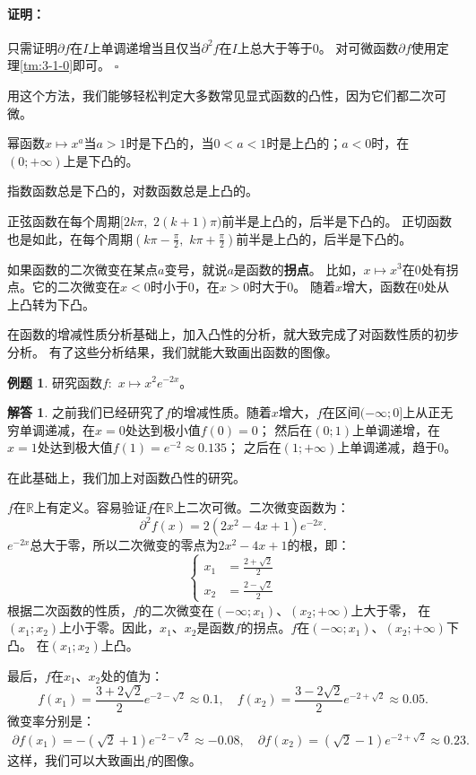 \documentclass[12pt,UTF8]{ctexbook}
\theoremstyle{definition}
\newtheorem{et}{例题}[section]
\newtheorem*{so}{解答}
\theoremstyle{plain}
\renewenvironment{proof}{\paragraph{\textbf{证明：}}}{\hfill$\square$}
\begin{document}
\begin{proof}
    只需证明$\partial f$在$I$上单调递增当且仅当$\partial^2 f$在$I$上总大于等于$0$。
    对可微函数$\partial f$使用定理\ref{tm:3-1-0}即可。
\end{proof}

用这个方法，我们能够轻松判定大多数常见显式函数的凸性，因为它们都二次可微。

幂函数$x\mapsto x^a$当$a>1$时是下凸的，当$0<a<1$时是上凸的；$a<0$时，在$(0;+\infty)$上是下凸的。

指数函数总是下凸的，对数函数总是上凸的。

正弦函数在每个周期$[2k\pi, \,\, 2(k+1)\pi)$前半是上凸的，后半是下凸的。
正切函数也是如此，在每个周期$(k\pi-\frac{\pi}{2}, \,\, k\pi+\frac{\pi}{2})$前半是上凸的，后半是下凸的。

如果函数的二次微变在某点$a$变号，就说$a$是函数的\textbf{拐点}。
比如，$x\mapsto x^3$在$0$处有拐点。它的二次微变在$x<0$时小于$0$，在$x>0$时大于$0$。
随着$x$增大，函数在$0$处从上凸转为下凸。

在函数的增减性质分析基础上，加入凸性的分析，就大致完成了对函数性质的初步分析。
有了这些分析结果，我们就能大致画出函数的图像。

\begin{et}
    研究函数$f:\,\,x\mapsto x^2 e^{-2x}$。
\end{et}

\begin{so}

    之前我们已经研究了$f$的增减性质。随着$x$增大，$f$在区间$(-\infty; 0]$上从正无穷单调递减，在$x = 0$处达到极小值$f(0) = 0$；
    然后在$(0; 1)$上单调递增，在$x = 1$处达到极大值$f(1) = e^{-2} \approx 0.135$；
    之后在$(1; +\infty)$上单调递减，趋于$0$。

    在此基础上，我们加上对函数凸性的研究。

    $f$在$\mathbb{R}$上有定义。容易验证$f$在$\mathbb{R}$上二次可微。二次微变函数为：
    $$ \partial^2 f (x) = 2(2x^2 - 4x + 1)e^{-2x}.$$
    $e^{-2x}$总大于零，所以二次微变的零点为$2x^2 - 4x + 1$的根，即：
    $$  
        \left\{ 
            \begin{array}{cl}
                x_1 &= \frac{2 + \sqrt{2}}{2} \\
                x_2 &= \frac{2 - \sqrt{2}}{2} 
            \end{array}
        \right.
    $$
    根据二次函数的性质，$f$的二次微变在$(-\infty; x_1)$、$(x_2; +\infty)$上大于零，
    在$(x_1; x_2)$上小于零。因此，$x_1$、$x_2$是函数$f$的拐点。$f$在$(-\infty; x_1)$、$(x_2; +\infty)$下凸。
    在$(x_1; x_2)$上凸。

    最后，$f$在$x_1$、$x_2$处的值为：
    $$ f(x_1) = \frac{3 + 2\sqrt{2}}{2} e^{-2-\sqrt{2}} \approx 0.1, \quad f(x_2) = \frac{3 - 2\sqrt{2}}{2} e^{-2+\sqrt{2}} \approx 0.05. $$
    微变率分别是：
    \begin{align*}
        \partial f(x_1) = -(\sqrt{2} + 1)e^{-2-\sqrt{2}} \approx -0.08, \quad  \partial f(x_2) = (\sqrt{2} - 1)e^{-2+\sqrt{2}} \approx 0.23. 
    \end{align*}
    这样，我们可以大致画出$f$的图像。
\end{so}
\end{document}
